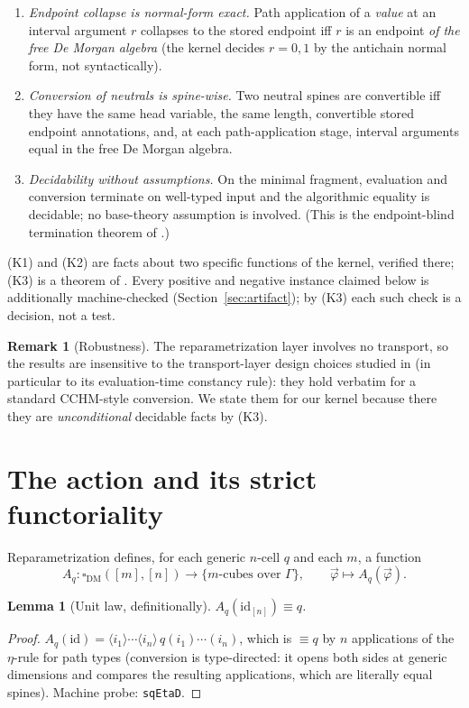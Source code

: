 \documentclass[11pt]{amsart}
\newtheorem{lem}[thm]{Lemma}
\theoremstyle{definition}
\newtheorem{rem}[thm]{Remark}
\newcommand{\Dbox}{\square_{\mathrm{DM}}}
\newcommand{\aconv}{\equiv}
\newcommand{\act}[1]{A_{#1}}
\begin{document}
\begin{enumerate}
\item[(K1)] \emph{Endpoint collapse is normal-form exact.}  Path
  application of a \emph{value} at an interval argument $r$ collapses
  to the stored endpoint iff $r$ is an endpoint \emph{of the free De
  Morgan algebra} (the kernel decides $r = 0,1$ by the antichain
  normal form, not syntactically).
\item[(K2)] \emph{Conversion of neutrals is spine-wise.}  Two
  neutral spines are convertible iff they have the same head
  variable, the same length, convertible stored endpoint
  annotations, and, at each path-application stage, interval
  arguments equal in the free De Morgan algebra.
\item[(K3)] \emph{Decidability without assumptions.}  On the minimal
  fragment, evaluation and conversion terminate on well-typed input
  and the algorithmic equality is decidable; no base-theory
  assumption is involved.  (This is the endpoint-blind termination
  theorem of \cite{Companion}.)
\end{enumerate}

(K1) and (K2) are facts about two specific functions of the kernel,
verified there; (K3) is a theorem of \cite{Companion}.  Every
positive and negative instance claimed below is additionally
machine-checked (Section~\ref{sec:artifact}); by (K3) each such
check is a decision, not a test.

\begin{rem}[Robustness]\label{rem:robust}
  The reparametrization layer involves no transport, so the results
  are insensitive to the transport-layer design choices studied in
  \cite{Companion} (in particular to its evaluation-time constancy
  rule): they hold verbatim for a standard CCHM-style conversion.
  We state them for our kernel because there they are
  \emph{unconditional} decidable facts by (K3).
\end{rem}

\section{The action and its strict functoriality}
\label{sec:action}

Reparametrization defines, for each generic $n$-cell $q$ and each
$m$, a function
\[
  \act{q} : \Dbox([m],[n]) \longrightarrow
  \{\text{$m$-cubes over } \Gamma\}, \qquad
  \vec\varphi \mapsto \act{q}(\vec\varphi).
\]

\begin{lem}[Unit law, definitionally]\label{lem:unit}
  $\act{q}(\mathrm{id}_{[n]}) \aconv q$.
\end{lem}
\begin{proof}
  $\act{q}(\mathrm{id}) = \langle i_1 \rangle \cdots \langle i_n
  \rangle\, q(i_1)\cdots(i_n)$, which is $\aconv q$ by $n$
  applications of the $\eta$-rule for path types (conversion is
  type-directed: it opens both sides at generic dimensions and
  compares the resulting applications, which are literally equal
  spines).  Machine probe: \texttt{sqEtaD}.
\end{proof}
\end{document}
